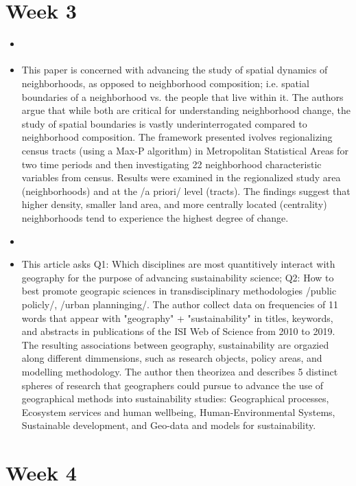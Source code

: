 \documentclass{article}
\begin{document}
\section{Week 3}
\begin{itemize}

\item \cite{rey2011MeasuringSpatial}
\item This paper is concerned with advancing the study of spatial dynamics of neighborhoods, as opposed to neighborhood composition; i.e. spatial boundaries of a neighborhood vs. the people that live within it. The authors argue that while both are critical for understanding neighborhood change, the study of spatial boundaries is vastly underinterrogated compared to neighborhood composition. The framework presented ivolves regionalizing census tracts (using a Max-P algorithm) in Metropolitan Statistical Areas for two time periods and then investigating 22 neighborhood characteristic variables from census. Results were examined in the regionalized study area (neighborhoods) and at the /a priori/ level (tracts). The findings suggest that higher density, smaller land area, and more centrally located (centrality) neighborhoods tend to experience the highest degree of change. 

\item \cite{fu2020PromotingGeography}
\item This article asks Q1: Which disciplines are most quantitively interact with geography for the purpose of advancing sustainability science; Q2: How to best promote geograpic sciences in transdisciplinary methodologies /public policly/, /urban planninging/. The author collect data on frequencies of 11 words that appear with "geography" + "sustainability" in titles, keywords, and abstracts in publications of the ISI Web of Science from 2010 to 2019. The resulting associations between geography, sustainability are orgazied along different dimmensions, such as research objects, policy areas, and modelling methodology. The author then theorizea and describes 5 distinct spheres of research that geographers could pursue to advance the use of geographical methods into sustainability studies: Geographical processes, Ecosystem services and human wellbeing, Human-Environmental Systems, Sustainable development, and Geo-data and models for sustainability.

\end{itemize}
\section{Week 4}
\end{document}
